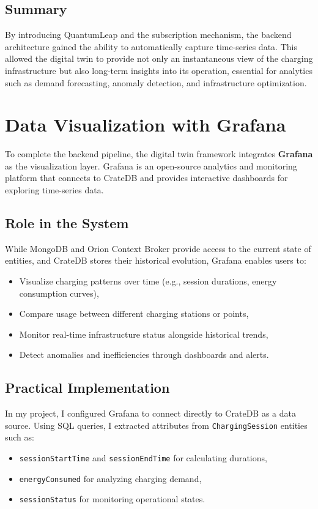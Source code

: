 \subsection*{Summary}
By introducing QuantumLeap and the subscription mechanism, the backend architecture gained the ability to automatically capture time-series data.  
This allowed the digital twin to provide not only an instantaneous view of the charging infrastructure but also long-term insights into its operation, essential for analytics such as demand forecasting, anomaly detection, and infrastructure optimization.

\section{Data Visualization with Grafana}

To complete the backend pipeline, the digital twin framework integrates \textbf{Grafana} as the visualization layer.  
Grafana is an open-source analytics and monitoring platform that connects to CrateDB and provides interactive dashboards for exploring time-series data.

\subsection*{Role in the System}
While MongoDB and Orion Context Broker provide access to the current state of entities, and CrateDB stores their historical evolution, Grafana enables users to:
\begin{itemize}
    \item Visualize charging patterns over time (e.g., session durations, energy consumption curves),
    \item Compare usage between different charging stations or points,
    \item Monitor real-time infrastructure status alongside historical trends,
    \item Detect anomalies and inefficiencies through dashboards and alerts.
\end{itemize}

\subsection*{Practical Implementation}
In my project, I configured Grafana to connect directly to CrateDB as a data source.  
Using SQL queries, I extracted attributes from \texttt{ChargingSession} entities such as:
\begin{itemize}
    \item \texttt{sessionStartTime} and \texttt{sessionEndTime} for calculating durations,
    \item \texttt{energyConsumed} for analyzing charging demand,
    \item \texttt{sessionStatus} for monitoring operational states.
\end{itemize}

